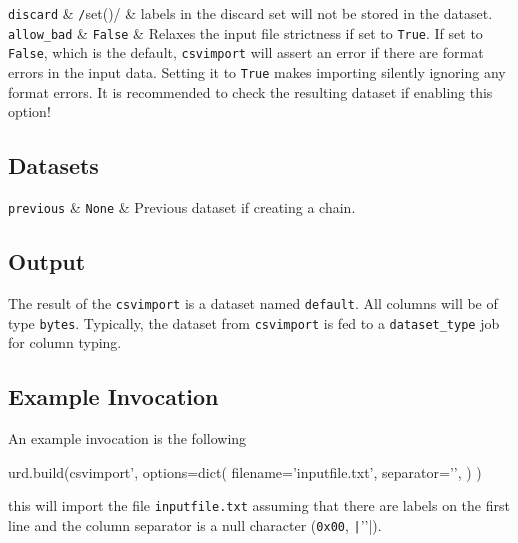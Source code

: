   \RP \texttt{discard} & \texttt/set()/ & labels in the discard set will
  not be stored in the dataset.\\
  
  \RP \texttt{allow\_bad} & \texttt{False} & Relaxes the input file
  strictness if set to \texttt{True}.  If set to \texttt{False}, which
  is the default, \texttt{csvimport} will assert an error if there are
  format errors in the input data.  Setting it to \texttt{True} makes
  importing silently ignoring any format errors.  It is recommended to
  check the resulting dataset if enabling this option!\\
\stoptable



\subsection{Datasets}

\starttable
  \RP \texttt{previous} & \texttt{None} & Previous dataset if creating a
  chain.\\
\stoptable



\subsection{Output}
The result of the \texttt{csvimport} is a dataset named
\texttt{default}.  All columns will be of type
\texttt{bytes}.  Typically, the dataset from
\texttt{csvimport} is fed to a \texttt{dataset\_type} job for column
typing.



\subsection{Example Invocation}
An example invocation is the following

\begin{python}
urd.build(csvimport',
    options=dict(
        filename='inputfile.txt',
        separator='\0',
    )
)
\end{python}
this will import the file \texttt{inputfile.txt} assuming that there
are labels on the first line and the column separator is a null
character (\texttt{0x00}, \texttt|'\0'|).








